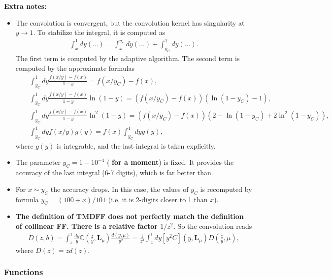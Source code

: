 \documentclass[prd,nofootinbib,eqsecnum,final]{revtex4}
\renewcommand{\(}{\left(}
\renewcommand{\)}{\right)}
\renewcommand{\[}{\left[}
\renewcommand{\]}{\right]}
\newcommand{\red}[1]{{\color[rgb]{1,0,0} #1}}
\begin{document}
\textbf{Extra notes:}
\begin{itemize}
\item The convolution is convergent, but the convolution kernel has singularity at $y\to1$. To stabilize the integral, it is computed as
\begin{eqnarray}
\int_x^1 dy (...)=\int_x^{y_C} dy (...)+\int_{y_C}^1 dy (...).
\end{eqnarray}
The first term is computed by the adaptive algorithm. The second term is computed by the approximate formulas
\begin{eqnarray*}
&& \int_{y_C}^1 dy \frac{f(x/y)-f(x)}{1-y}=f(x/y_C)-f(x),
\\
&&\int_{y_C}^1 dy \frac{f(x/y)-f(x)}{1-y}\ln(1-y)=(f(x/y_C)-f(x))(\ln(1-y_C)-1),
\\
&&\int_{y_C}^1 dy \frac{f(x/y)-f(x)}{1-y}\ln^2(1-y)=(f(x/y_C)-f(x))(2-\ln(1-y_C)+2\ln^2(1-y_C)),
\\
&& \int_{y_C}^1 dy f(x/y)g(y)=f(x)\int_{y_C}^1 dy g(y),
\end{eqnarray*}
where $g(y)$ is integrable, and the last integral is taken explicitly.
\item The parameter $y_C=1-10^{-4}$ (\textbf{\red{for a moment}}) is fixed. It provides the accuracy of the last integral (6-7 digits), which is far better than.
\item For $x\sim y_C$ the accuracy drops. In this case, the values of $y_C$ is recomputed by formula $y_C=(100+x)/101$ (i.e. it is 2-digits closer to 1 than $x$).
\item \textbf{The definition of TMDFF does not perfectly match the definition of collinear FF. There is a relative factor $1/z^2$.} So the convolution reads
\begin{eqnarray}
D(z,b)=\int_z^1 \frac{dy}{y}\mathbb{C}\(\frac{z}{y},\mathbf{L}_\mu\)\frac{d(y,\mu)}{y^2}=
\frac{1}{z^3}\int_z^1 dy [y^2C]\(y,\mathbf{L}_\mu\)D(\frac{z}{y},\mu),
\end{eqnarray}
where $D(z)=zd(z)$.
\end{itemize}

\subsubsection{Functions}
\end{document}
